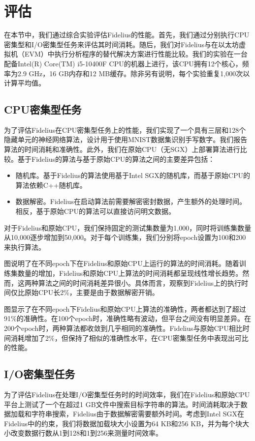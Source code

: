 \section{评估}

在本节中，我们通过综合实验评估Fidelius的性能。首先，我们通过分别执行CPU密集型和I/O密集型任务来评估其时间消耗。随后，我们对Fidelius与在以太坊虚拟机（EVM）中执行分析程序的替代解决方案进行性能比较。我们的实验在一台配备Intel(R) Core(TM) i5-10400F CPU的机器上进行，该CPU拥有12个核心，频率为2.9 GHz，16 GB内存和12 MB缓存。除非另有说明，每个实验重复1,000次以计算平均值。

\subsection{CPU密集型任务}
为了评估Fidelius在CPU密集型任务上的性能，我们实现了一个具有三层和128个隐藏单元的神经网络算法，设计用于使用MNIST数据集识别手写数字。我们报告算法的时间消耗和准确性。此外，我们在原始CPU（无SGX）上部署算法进行比较。基于Fidelius的算法与基于原始CPU的算法之间的主要差异包括：
\begin{itemize}
  \item 随机库。基于Fidelius的算法使用基于Intel SGX的随机库，而基于原始CPU的算法依赖C++随机库。
  \item 数据解密。Fidelius在启动算法前需要解密密封数据，产生额外的处理时间。相反，基于原始CPU的算法可以直接访问明文数据。
\end{itemize}
对于Fidelius和原始CPU，我们保持固定的测试集数量为1,000，同时将训练集数量从10,000逐步增加到50,000。对于每个训练集，我们分别将epoch设置为100和200来执行算法。

图说明了在不同epoch下在Fidelius和原始CPU上运行的算法的时间消耗。随着训练集数量的增加，Fidelius和原始CPU上算法的时间消耗都呈现线性增长趋势。然而，这两种算法之间的时间消耗差异很小。具体而言，观察到Fidelius上的执行时间仅比原始CPU长2\%，主要是由于数据解密开销。

图显示了在不同epoch下Fidelius和原始CPU上算法的准确性，两者都达到了超过91\%的准确性。在100个epoch时，准确性略有波动，但平台之间没有明显差异。在200个epoch时，两种算法都收敛到几乎相同的准确性。Fidelius与原始CPU相比时间消耗增加了2\%，但保持了相似的准确性水平，在CPU密集型任务中表现出可比的性能。

\subsection{I/O密集型任务}
为了评估Fidelius在处理I/O密集型任务时的时间效率，我们在Fidelius和原始CPU平台上测试了一个在超过1 GB文件中搜索目标字符串的算法。时间消耗取决于数据加载和字符串搜索，Fidelius由于数据解密需要额外时间。考虑到Intel SGX在Fidelius中的约束，我们将数据加载块大小设置为64 KB和256 KB，并为每个块大小改变数据行数从1到128和1到256来测量时间效率。

